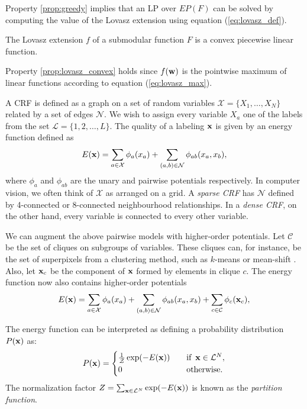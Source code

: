 Property \ref{prop:greedy} implies that an LP over $EP(F)$ can be solved by computing the value of the Lovasz extension using equation (\ref{eq:lovasz_def}).

{\prop The Lovasz extension $f$ of a submodular function $F$ is a convex piecewise linear function.\label{prop:lovasz_convex}}

Property \ref{prop:lovasz_convex} holds since $f({\bf w})$ is the pointwise maximum of linear functions according to equation (\ref{eq:lovasz_max}).

A CRF is defined as a graph on a set of random variables ${\mathcal X} = \{X_1,\dots, X_N\}$ related by a set of edges $\mathcal N$. We wish to assign every variable $X_a$ one of the labels from the set $\mathcal{L} = \{1, 2, \dots, L\}$. The quality of a labeling $\bf x$ is given by an energy function defined as 
%
\begin{equation}
    E({\bf x}) = \sum_{a \in {\mathcal X}} \phi_a(x_a) + \sum_{(a, b) \in {\mathcal N}} \phi_{ab}(x_a, x_b),
    \label{eq:energy_min}
  \end{equation}
%
where $\phi_a$ and $\phi_{ab}$ are the unary and pairwise potentials respectively. In computer vision, we often think of $\mathcal X$ as arranged on a grid. A \emph{sparse CRF} has $\mathcal N$ defined by 4-connected or 8-connected neighbourhood relationships. In a \emph{dense CRF}, on the other hand, every variable is connected to every other variable.

We can augment the above pairwise models with higher-order potentials. Let
$\mathcal C$ be the set of cliques on subgroups of variables. These cliques
can, for instance, be the set of superpixels from a clustering method, such as
$k$-means or mean-shift \cite{comaniciu2002mean}. Also, let ${\bf x}_c$ be the component of $\bf x$ formed by elements in clique $c$. The energy function now also contains higher-order potentials 
%
\begin{equation}
    E({\bf x}) = \sum_{a \in {\mathcal X}} \phi_a(x_a) + \sum_{(a, b) \in {\mathcal N}} \phi_{ab}(x_a, x_b) + \sum_{c \in {\mathcal C}} \phi_c({{\bf x}_c}),
    \label{eq:energy_hop_min}
  \end{equation}
%
 
The energy function can be interpreted as defining a probability distribution $P({\bf x})$ as:
\begin{equation}
    P({\bf x}) =
    \begin{cases}
        \frac{1}{\mathcal{Z}} \exp(-E({\bf x})) & \quad \text{if} \enskip {\bf x} \in {\mathcal L}^N,\\
       0  & \quad \text{otherwise}. \\
    \end{cases}
\label{eq:crf_prob_distrib}
\end{equation}
The normalization factor $Z = \sum_{{\bf x} \in {\mathcal L}^N} \exp(-E({\bf x}))$ is known as the {\it partition function}. 


